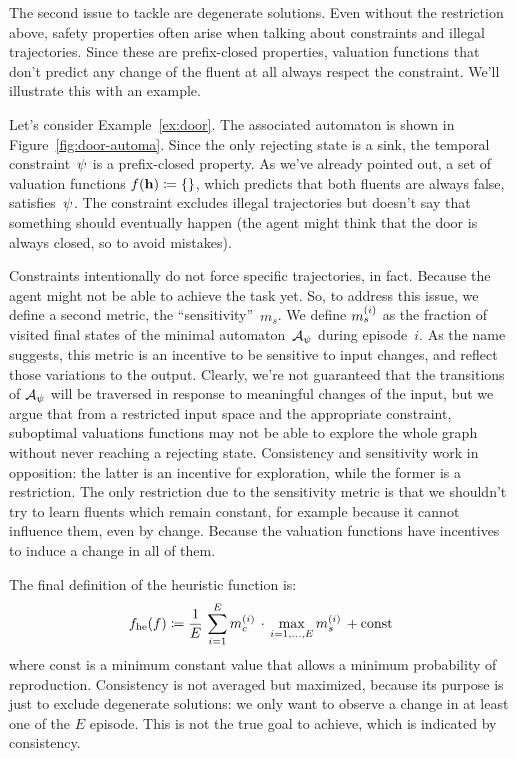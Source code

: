 The second issue to tackle are degenerate solutions. Even without the
restriction above, safety properties often arise when talking about
constraints and illegal trajectories. Since these are prefix-closed
properties, valuation functions that don't predict any change of the fluent at
all always respect the constraint. We'll illustrate this with an example.
\begin{example}
	Let's consider Example~\vref{ex:door}. The associated automaton is shown in
	Figure~\ref{fig:door-automa}. Since the only rejecting state is a sink, the
	temporal constraint~$\psi$ is a prefix-closed property. As we've
	already pointed out, a set of valuation functions $f(\mathbf{h}) \coloneqq \{\}$,
	which predicts that both fluents are always false, satisfies~$\psi$.
	The constraint excludes illegal trajectories but doesn't say that something
	should eventually happen (the agent might think that the door is always
	closed, so to avoid mistakes).
\end{example}
Constraints intentionally do not force specific trajectories, in fact.
Because the agent might not be able to achieve the task yet. So, to address
this issue, we define a second metric, the ``sensitivity''~$m_s$. We define
$m_s^{(i)}$ as the fraction of visited final states of the minimal
automaton~$\mathcal{A}_\psi$ during episode~$i$. As the name suggests,
this metric is an incentive to be sensitive to input changes, and reflect
those variations to the output. Clearly, we're not guaranteed that the
transitions of $\mathcal{A}_\psi$ will be traversed in response to
meaningful changes of the input, but we argue that from a restricted input
space and the appropriate constraint, suboptimal valuations functions may not
be able to explore the whole graph without never reaching a rejecting state.
Consistency and sensitivity work in opposition: the latter is an incentive for
exploration, while the former is a restriction. The only restriction due to
the sensitivity metric is that we shouldn't try to learn fluents which remain
constant, for example because it cannot influence them, even by change.
Because the valuation functions have incentives to induce a change in all of
them.

The final definition of the heuristic function is:
\begin{equation}
	f_{\text{he}}(f) \coloneqq \frac{1}{E}\,\sum_{i=1}^E m_c^{(i)}
	\, \cdot \, \max_{i=1,\dots,E} m_s^{(i)} \, + \text{const}
\end{equation}
where $\text{const}$ is a minimum constant value that allows a minimum
probability of reproduction. Consistency is not averaged but maximized,
because its purpose is just to exclude degenerate solutions: we only want to
observe a change in at least one of the $E$ episode. This is not the true goal
to achieve, which is indicated by consistency.

